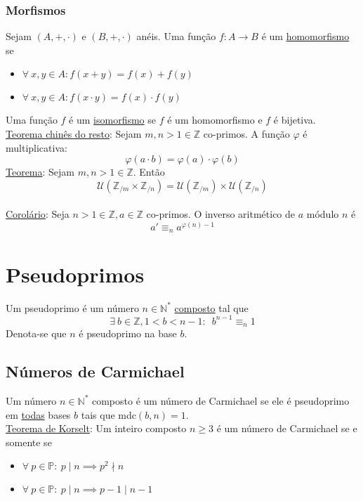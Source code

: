 \documentclass{article}
\begin{document}
\subsubsection{Morfismos}
Sejam $(A, +, \cdot)$ e $(B, +, \cdot)$ anéis. Uma função $f: A \to B$ é um \uline{homomorfismo} se
\begin{itemize}
  \item $\forall\: x,y \in A: f(x+y) = f(x) + f(y)$
  \item $\forall\: x,y \in A: f(x \cdot y) = f(x) \cdot f(y)$
\end{itemize}
\vspace{5pt}
Uma função $f$ é um \uline{isomorfismo} se $f$ é um homomorfismo e $f$ é bijetiva. \\[5pt]
\uline{Teorema chinês do resto}: Sejam $m,n > 1 \in \mathbb{Z}$ co-primos. A função $\varphi$ é multiplicativa:
\[ \varphi (a \cdot b) = \varphi(a) \cdot \varphi(b) \]
\uline{Teorema}: Sejam $m,n > 1 \in \mathbb{Z}$. Então
\[ \mathcal{U} \left( \mathbb{Z}_{/m} \times \mathbb{Z}_{/n} \right) = \mathcal{U} \left( \mathbb{Z}_{/m} \right) \times \mathcal{U} \left( \mathbb{Z}_{/n} \right) \]
\\
\uline{Corolário}: Seja $n > 1 \in \mathbb{Z}, a \in \mathbb{Z}$ co-primos. O inverso aritmético de $a$ módulo $n$ é
\[ a' \equiv_n a^{\varphi(n) - 1} \]



\section{Pseudoprimos}
Um pseudoprimo é um número $n \in \mathbb{N}^*$ \uline{composto} tal que
\[ \exists\: b \in \mathbb{Z}, 1 < b < n - 1:\enspace b^{n - 1} \equiv_n 1 \]
Denota-se que $n$ é pseudoprimo na base $b$.

\subsection{Números de Carmichael}
Um número $n \in \mathbb{N}^*$ composto é um número de Carmichael se ele é pseudoprimo em \uline{todas} bases $b$ tais que mdc$(b,n) = 1$. \\[10pt]
\uline{Teorema de Korselt}: Um inteiro composto $n \geq 3$ é um número de Carmichael se e somente se
\begin{itemize}
  \item $\forall\: p \in \mathbb{P}: \> p \mid n \implies p^2 \nmid n$
  \item $\forall\: p \in \mathbb{P}: \> p \mid n \implies p - 1 \mid n - 1$
\end{itemize}
\end{document}
